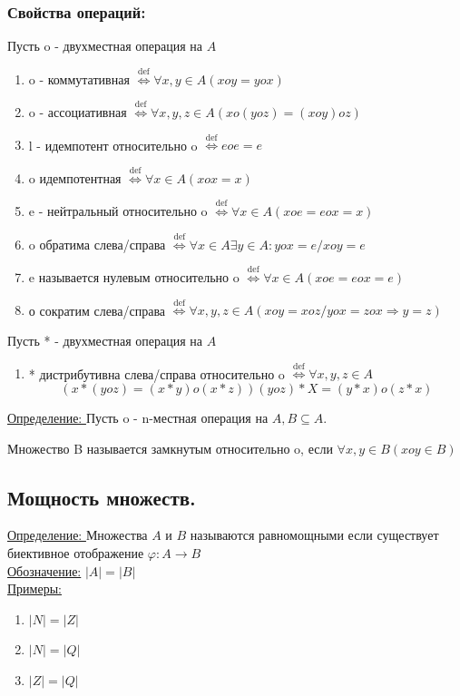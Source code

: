 \documentclass[12pt]{article}
\begin{document}
    \subsubsection*{Свойства операций: }
    \par\noindent
    Пусть o - двухместная операция на $A$
    \begin{enumerate}
        \item o - коммутативная $\overset{\text{def}}{\Leftrightarrow} \forall x,y \in A (x o y = y o x)$ %
        \item o - ассоциативная $\overset{\text{def}}{\Leftrightarrow} \forall x,y,z \in A (x o(y o z)=(xoy)oz)$
        \item l - идемпотент относительно o $\overset{\text{def}}{\Leftrightarrow} e o e = e$ %
        \item  o идемпотентная $\overset{\text{def}}{\Leftrightarrow} \forall x \in A (xox=x)$%
        \item e - нейтральный относительно o $\overset{\text{def}}{\Leftrightarrow} \forall x \in A (xoe=eox=x)$
        \item o обратима слева/справа $\overset{\text{def}}{\Leftrightarrow} \forall x \in A \exists y \in A: yox=e/xoy=e$
        \item e называется нулевым относительно o $\overset{\text{def}}{\Leftrightarrow} \forall x \in A (xoe=eox=e)$
        \item о сократим слева/справа $\overset{\text{def}}{\Leftrightarrow} \forall x,y,z \in A 
        (xoy=xoz/yox=zox \Rightarrow y=z)$ 
    \end{enumerate}
    Пусть * - двухместная операция на $A$
    \begin{enumerate}
        \item[9.] * дистрибутивна слева/справа относительно o $\overset{\text{def}}{\Leftrightarrow} 
        \forall x,y,z \in A$ \[(x*(yoz)=(x*y)o(x*z))(yoz)*X=(y*x)o(z*x)\]
    \end{enumerate}
    \underline{Определение: } Пусть o - n-местная операция на $A,B \subseteq A.$ 
    \begin{center}
        Множество B называется замкнутым относительно o, если $\forall x,y \in B (xoy \in B)$        
    \end{center}

    \subsection{Мощность множеств.}
    \underline{Определение: } Множества $A$ и $B$ называются равномощными если существует\\ биективное
    отображение $\varphi: A \rightarrow B$\\
    \underline{Обозначение:} $|A|=|B|$\\
    \underline{Примеры:}
    \begin{enumerate}
        \item $|N|=|Z|$
        \item $|N|=|Q|$
        \item $|Z|=|Q|$
    \end{enumerate}
    \pagebreak
\end{document}

